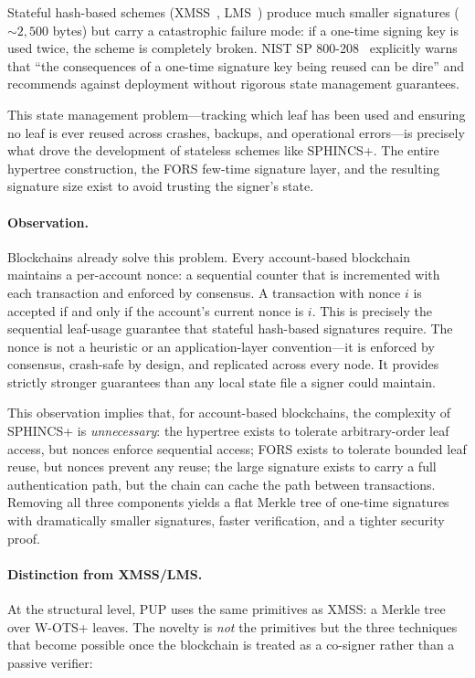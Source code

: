 \documentclass[11pt]{article}
\begin{document}
Stateful hash-based schemes (XMSS~\cite{xmss}, LMS~\cite{lms}) produce
much smaller signatures (${\sim}2{,}500$ bytes) but carry a catastrophic
failure mode: if a one-time signing key is used twice, the scheme is
completely broken. NIST SP 800-208~\cite{nist-sp800-208} explicitly
warns that ``the consequences of a one-time signature key being reused
can be dire'' and recommends against deployment without rigorous state
management guarantees.

This state management problem---tracking which leaf has been used and
ensuring no leaf is ever reused across crashes, backups, and operational
errors---is precisely what drove the development of stateless schemes
like SPHINCS+. The entire hypertree construction, the FORS few-time
signature layer, and the resulting signature size exist to avoid trusting
the signer's state.

\paragraph{Observation.} Blockchains already solve this problem.
Every account-based blockchain maintains a per-account nonce: a
sequential counter that is incremented with each transaction and
enforced by consensus. A transaction with nonce $i$ is accepted if and
only if the account's current nonce is $i$. This is precisely the
sequential leaf-usage guarantee that stateful hash-based signatures
require. The nonce is not a heuristic or an application-layer
convention---it is enforced by consensus, crash-safe by design, and
replicated across every node. It provides strictly stronger guarantees
than any local state file a signer could maintain.

This observation implies that, for account-based blockchains, the
complexity of SPHINCS+ is \emph{unnecessary}: the hypertree exists to
tolerate arbitrary-order leaf access, but nonces enforce sequential
access; FORS exists to tolerate bounded leaf reuse, but nonces prevent
any reuse; the large signature exists to carry a full authentication
path, but the chain can cache the path between transactions. Removing
all three components yields a flat Merkle tree of one-time signatures
with dramatically smaller signatures, faster verification, and a
tighter security proof.

\paragraph{Distinction from XMSS/LMS.}
At the structural level, PUP uses the same primitives as XMSS: a
Merkle tree over W-OTS+ leaves. The novelty is \emph{not} the
primitives but the three techniques that become possible once the
blockchain is treated as a co-signer rather than a passive verifier:
\end{document}
